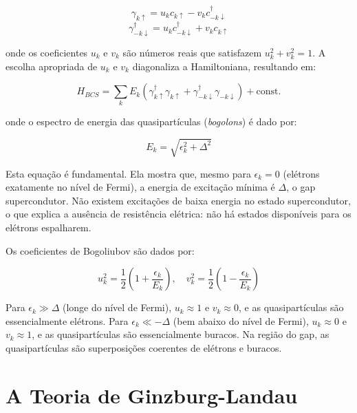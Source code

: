 \documentclass[12pt, a4paper, oneside]{report}
\begin{document}
\begin{equation}
    \gamma_{k\uparrow} = u_k c_{k\uparrow} - v_k c_{-k\downarrow}^\dagger
\end{equation}
\begin{equation}
    \gamma_{-k\downarrow}^\dagger = u_k c_{-k\downarrow}^\dagger + v_k c_{k\uparrow}
\end{equation}

onde os coeficientes $u_k$ e $v_k$ são números reais que satisfazem $u_k^2 + v_k^2 = 1$. A escolha apropriada de $u_k$ e $v_k$ diagonaliza a Hamiltoniana, resultando em:

\begin{equation}
    H_{BCS} = \sum_k E_k (\gamma_{k\uparrow}^\dagger \gamma_{k\uparrow} + \gamma_{-k\downarrow}^\dagger \gamma_{-k\downarrow}) + \text{const.}
\end{equation}

onde o espectro de energia das quasipartículas (\textit{bogolons}) é dado por:

\begin{equation}
    E_k = \sqrt{\epsilon_k^2 + \Delta^2}
\end{equation}

Esta equação é fundamental. Ela mostra que, mesmo para $\epsilon_k = 0$ (elétrons exatamente no nível de Fermi), a energia de excitação mínima é $\Delta$, o gap supercondutor. Não existem excitações de baixa energia no estado supercondutor, o que explica a ausência de resistência elétrica: não há estados disponíveis para os elétrons espalharem.

Os coeficientes de Bogoliubov são dados por:

\begin{equation}
    u_k^2 = \frac{1}{2} \left( 1 + \frac{\epsilon_k}{E_k} \right), \quad v_k^2 = \frac{1}{2} \left( 1 - \frac{\epsilon_k}{E_k} \right)
\end{equation}

Para $\epsilon_k \gg \Delta$ (longe do nível de Fermi), $u_k \approx 1$ e $v_k \approx 0$, e as quasipartículas são essencialmente elétrons. Para $\epsilon_k \ll -\Delta$ (bem abaixo do nível de Fermi), $u_k \approx 0$ e $v_k \approx 1$, e as quasipartículas são essencialmente buracos. Na região do gap, as quasipartículas são superposições coerentes de elétrons e buracos.

\section{A Teoria de Ginzburg-Landau}
\end{document}
